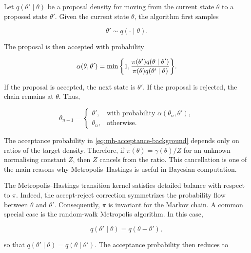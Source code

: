 Let $q(\theta'\mid\theta)$ be a proposal density for moving from the current state $\theta$ to a proposed state $\theta'$.
Given the current state $\theta$, the algorithm first samples

\begin{equation}
    \theta'
    \sim
    q(\cdot\mid\theta).
    \label{eq:mh-proposal-background}
\end{equation}

The proposal is then accepted with probability

\begin{equation}
    \alpha(\theta,\theta')
    =
    \min\qty{
    1,
    \frac{\pi(\theta')q(\theta\mid\theta')}
    {\pi(\theta)q(\theta'\mid\theta)}
    }.
    \label{eq:mh-acceptance-background}
\end{equation}

If the proposal is accepted, the next state is $\theta'$.
If the proposal is rejected, the chain remains at $\theta$.
Thus,

\begin{equation}
    \theta_{n+1}
    =
    \begin{cases}
    \theta',
    &
    \text{with probability } \alpha(\theta_n,\theta'),
    \\
    \theta_n,
    &
    \text{otherwise}.
    \end{cases}
    \label{eq:mh-transition-background}
\end{equation}

The acceptance probability in \eqref{eq:mh-acceptance-background} depends only on ratios of the target density.
Therefore, if $\pi(\theta)=\gamma(\theta)/Z$ for an unknown normalising constant $Z$, then $Z$ cancels from the ratio.
This cancellation is one of the main reasons why Metropolis--Hastings is useful in Bayesian computation.

The Metropolis--Hastings transition kernel satisfies detailed balance with respect to $\pi$.
Indeed, the accept-reject correction symmetrizes the probability flow between $\theta$ and $\theta'$.
Consequently, $\pi$ is invariant for the Markov chain.
A common special case is the random-walk Metropolis algorithm.
In this case,

\begin{equation}
    q(\theta'\mid\theta)
    =
    q(\theta-\theta'),
    \label{eq:random-walk-proposal-background}
\end{equation}

so that $q(\theta'\mid\theta)=q(\theta\mid\theta')$.
The acceptance probability then reduces to

